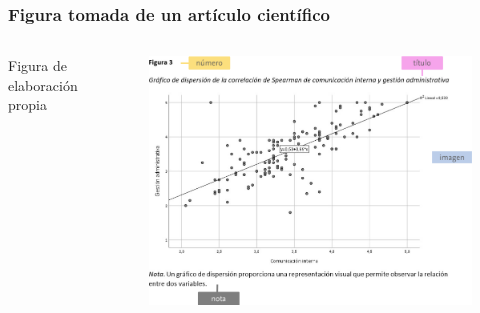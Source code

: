 \documentclass[
11pt, %
]{beamer}
\begin{document}
\begin{frame}
	\frametitle{Figura tomada de un artículo científico}

	\begin{columns}[c] %
		\begin{column}{0.5\textwidth} %
			Figura de elaboración propia
		\end{column}
		\begin{column}{0.5\textwidth} %
			\begin{figure}
				\centering
				\includegraphics[width=1\linewidth]{images/screenshot020}
			\end{figure}

		\end{column}
	\end{columns}

\end{frame}
\end{document}
